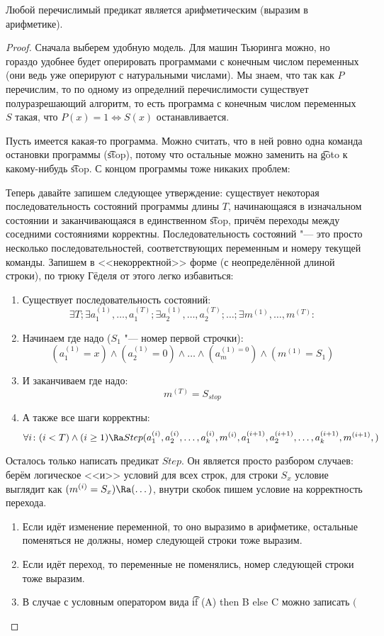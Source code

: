 \begin{theorem}
	Любой перечислимый предикат является арифметическим (выразим в арифметике).
\end{theorem}
\begin{proof}
	Сначала выберем удобную модель.
	Для машин Тьюринга можно, но гораздо удобнее будет оперировать программами с конечным числом переменных
	(они ведь уже оперируют с натуральными числами). %
	Мы знаем, что так как $P$ перечислим, то по одному из определний перечислимости существует
	полуразрешающий алгоритм, то есть программа с конечным числом
	переменных $S$ такая, что $P(x) = 1 \iff S(x)$ останавливается.

	Пусть имеется какая-то программа.
	Можно считать, что в ней ровно одна команда остановки программы (\t{stop}), потому что остальные
	можно заменить на \t{goto} к какому-нибудь \t{stop}.
	С концом программы тоже никаких проблем: \TODO

	Теперь давайте запишем следующее утверждение: существует некоторая последовательность
	состояний программы длины $T$, начинающаяся в изначальном состоянии и заканчивающаяся в единственном
	\t{stop}, причём переходы между соседними состояниями корректны.
	Последовательность состояний "--- это просто несколько последовательностей, соответствующих переменным
	и номеру текущей команды.
	Запишем в <<некорректной>> форме (с неопределённой длиной строки), по трюку Гёделя от этого легко избавиться:
	\begin{enumerate}
		\item Существует последовательность состояний:
			\[
			\exists T;
			\exists a_1^{(1)}, \dots, a_1^{(T)};
			\exists a_2^{(1)}, \dots, a_2^{(T)};
			\dots;
			\exists m^{(1)}, \dots, m^{(T)}
			\colon
			\]
		\item Начинаем где надо ($S_1$ "--- номер первой строчки):
			\[
			(a_1^{(1)} = x) \land (a_2^{(1)} = 0) \land \dots \land (a_m^{(1) = 0}) \land (m^{(1)} = S_1)
			\]
		\item И заканчиваем где надо:
			\[
			m^{(T)}=S_{stop}
			\]
		\item А также все шаги корректны:
			\[
			\forall i \colon (i < T) \land (i \ge 1) \Ra Step(
			a_1^{(i)}, a_2^{(i)}, \dots, a_k^{(i)}, m^{(i)},
			a_1^{(i+1)}, a_2^{(i+1)}, \dots, a_k^{(i+1)}, m^{(i+1)},
			)
			\]
	\end{enumerate}
	Осталось только написать предикат $Step$.
	Он является просто разбором случаев: берём логическое <<и>> условий для всех строк,
	для строки $S_x$ условие выглядит как $(m^{(i)} = S_x) \Ra (\dots)$, внутри скобок
	пишем условие на корректность перехода.
	\begin{enumerate}
		\item Если идёт изменение переменной, то оно выразимо в арифметике, остальные поменяться не должны,
			номер следующей строки тоже выразим.
		\item Если идёт переход, то переменные не поменялись, номер следующей строки тоже выразим.
		\item В случае с условным оператором вида \t{if (A) then B else C} можно записать $($
	\end{enumerate}
\end{proof}

